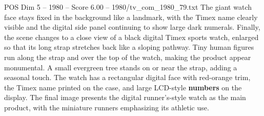 \begin{textsample}{POS Dim 5 – 1980 – Score 6.00 – 1980/tv\_com\_1980\_79.txt}
The giant watch face stays fixed in the background like a landmark, with the Timex name clearly visible and the digital side panel continuing to show large dark numerals.
Finally, the scene changes to a close view of a black digital Timex sports watch, enlarged so that its long strap stretches back like a sloping pathway.
Tiny human figures run along the strap and over the top of the watch, making the product appear monumental.
A small evergreen tree stands on or near the strap, adding a seasonal touch.
The watch has a rectangular digital face with red-orange trim, the Timex name printed on the case, and large LCD-style \textbf{numbers} on the display.
The final image presents the digital runner’s-style watch as the main product, with the miniature runners emphasizing its athletic use.

\end{textsample}
